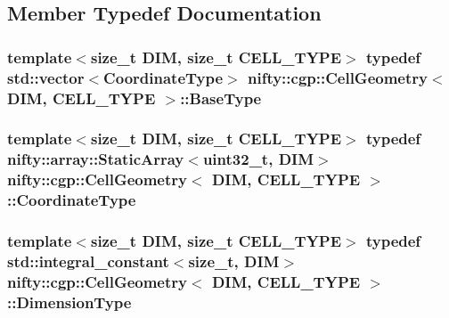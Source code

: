 \subsection{Member Typedef Documentation}
\hypertarget{classnifty_1_1cgp_1_1CellGeometry_ada76b5372b0e456edf3496813b9ed7f0}{}
\subsubsection[{Base\+Type}]{\setlength{\rightskip}{0pt plus 5cm}template$<$size\+\_\+t D\+I\+M, size\+\_\+t C\+E\+L\+L\+\_\+\+T\+Y\+P\+E$>$ typedef std\+::vector$<${\bf Coordinate\+Type}$>$ {\bf nifty\+::cgp\+::\+Cell\+Geometry}$<$ D\+I\+M, C\+E\+L\+L\+\_\+\+T\+Y\+P\+E $>$\+::{\bf Base\+Type}}\label{classnifty_1_1cgp_1_1CellGeometry_ada76b5372b0e456edf3496813b9ed7f0}
\hypertarget{classnifty_1_1cgp_1_1CellGeometry_af8ae7d6b7a8f20afae6ce53e88604acf}{}
\subsubsection[{Coordinate\+Type}]{\setlength{\rightskip}{0pt plus 5cm}template$<$size\+\_\+t D\+I\+M, size\+\_\+t C\+E\+L\+L\+\_\+\+T\+Y\+P\+E$>$ typedef {\bf nifty\+::array\+::\+Static\+Array}$<$uint32\+\_\+t, D\+I\+M$>$ {\bf nifty\+::cgp\+::\+Cell\+Geometry}$<$ D\+I\+M, C\+E\+L\+L\+\_\+\+T\+Y\+P\+E $>$\+::{\bf Coordinate\+Type}}\label{classnifty_1_1cgp_1_1CellGeometry_af8ae7d6b7a8f20afae6ce53e88604acf}
\hypertarget{classnifty_1_1cgp_1_1CellGeometry_a8cc75c7033c03864e099a5d907de88d8}{}
\subsubsection[{Dimension\+Type}]{\setlength{\rightskip}{0pt plus 5cm}template$<$size\+\_\+t D\+I\+M, size\+\_\+t C\+E\+L\+L\+\_\+\+T\+Y\+P\+E$>$ typedef std\+::integral\+\_\+constant$<$size\+\_\+t, D\+I\+M$>$ {\bf nifty\+::cgp\+::\+Cell\+Geometry}$<$ D\+I\+M, C\+E\+L\+L\+\_\+\+T\+Y\+P\+E $>$\+::{\bf Dimension\+Type}}\label{classnifty_1_1cgp_1_1CellGeometry_a8cc75c7033c03864e099a5d907de88d8}
\hypertarget{classnifty_1_1cgp_1_1CellGeometry_a07e98f74f6dc5cda1aab1349c7f60d5b}{}
